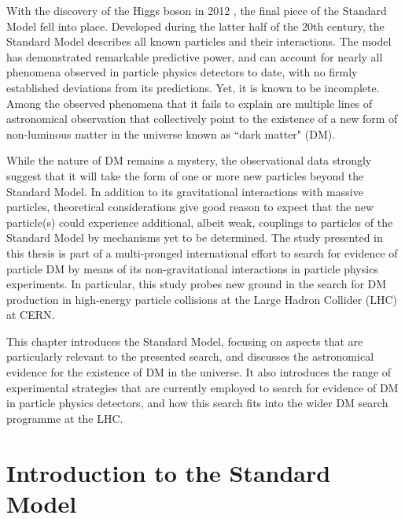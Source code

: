 \label{chapter:introduction}

With the discovery of the Higgs boson in 2012 \cite{atlas_higgs_2012, cms_higgs_2012}, the final piece of the Standard Model fell into place. Developed during the latter half of the 20th century, the Standard Model describes all known particles and their interactions. The model has demonstrated remarkable predictive power, and can account for nearly all phenomena observed in particle physics detectors to date, with no firmly established deviations from its predictions. Yet, it is known to be incomplete. Among the observed phenomena that it fails to explain \cite{einstein_1920, neutrino_oscillations_1998, Canetti_2012} are multiple lines of astronomical observation that collectively point to the existence of a new form of non-luminous matter in the universe known as ``dark matter" (DM). 

While the nature of DM remains a mystery, the observational data strongly suggest that it will take the form of one or more new particles beyond the Standard Model. In addition to its gravitational interactions with massive particles, theoretical considerations 
give good reason to expect that the new particle(s) could experience additional, albeit weak, couplings to particles of the Standard Model by mechanisms yet to be determined. The study presented in this thesis is part of a multi-pronged international effort to search for evidence of particle DM by means of its non-gravitational interactions in particle physics experiments. In particular, this study probes new ground in the search for DM production in high-energy particle collisions at the Large Hadron Collider (LHC) at CERN. 

This chapter introduces the Standard Model, focusing on aspects that are particularly relevant to the presented search, and discusses the astronomical evidence for the existence of DM in the universe. It also introduces the range of experimental strategies that are currently employed to search for evidence of DM in particle physics detectors, and how this search fits into the wider DM search programme at the LHC. 

\section{Introduction to the Standard Model}

